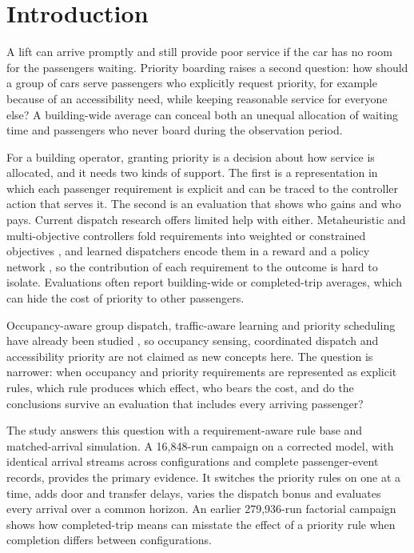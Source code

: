 \section{Introduction}\label{introduction}

A lift can arrive promptly and still provide poor service if the car has no room for the passengers waiting. Priority boarding raises a second question: how should a group of cars serve passengers who explicitly request priority, for example because of an accessibility need, while keeping reasonable service for everyone else? A building-wide average can conceal both an unequal allocation of waiting time and passengers who never board during the observation period.

For a building operator, granting priority is a decision about how service is allocated, and it needs two kinds of support. The first is a representation in which each passenger requirement is explicit and can be traced to the controller action that serves it. The second is an evaluation that shows who gains and who pays. Current dispatch research offers limited help with either. Metaheuristic and multi-objective controllers fold requirements into weighted or constrained objectives \cite{hanif2023,vodopija2022,beamurgia2022}, and learned dispatchers encode them in a reward and a policy network \cite{ref3,wan2026}, so the contribution of each requirement to the outcome is hard to isolate. Evaluations often report building-wide or completed-trip averages, which can hide the cost of priority to other passengers.

Occupancy-aware group dispatch, traffic-aware learning and priority scheduling have already been studied \cite{ref1,ref3,ref5}, so occupancy sensing, coordinated dispatch and accessibility priority are not claimed as new concepts here. The question is narrower: when occupancy and priority requirements are represented as explicit rules, which rule produces which effect, who bears the cost, and do the conclusions survive an evaluation that includes every arriving passenger?

The study answers this question with a requirement-aware rule base and matched-arrival simulation. A 16,848-run campaign on a corrected model, with identical arrival streams across configurations and complete passenger-event records, provides the primary evidence. It switches the priority rules on one at a time, adds door and transfer delays, varies the dispatch bonus and evaluates every arrival over a common horizon. An earlier 279,936-run factorial campaign shows how completed-trip means can misstate the effect of a priority rule when completion differs between configurations.

